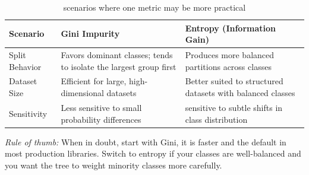 %

\begin{table}[ht]
\centering
\setlength{\tabcolsep}{10pt}
\renewcommand{\arraystretch}{1.7}
\caption{%
  scenarios where one metric may be more practical
}
\label{tab:gini-vs-entropy}
\begin{tabular}{
  >{\raggedright\arraybackslash}p{3.0cm}
  >{\raggedright\arraybackslash}p{5.0cm}
  >{\raggedright\arraybackslash}p{5.0cm}
}
\toprule
\textbf{Scenario}
  & \textbf{Gini Impurity}
  & \textbf{Entropy (Information Gain)} \\
\midrule
Split Behavior
  & Favors dominant classes; tends to isolate the largest group first
  & Produces more balanced partitions across classes \\

Dataset Size
  & Efficient for large, high-dimensional datasets
  & Better suited to structured datasets with balanced classes \\

Sensitivity
  & Less sensitive to small probability differences
  & sensitive to subtle shifts in class distribution \\

\bottomrule
\end{tabular}

\smallskip
\footnotesize
\textit{Rule of thumb:} When in doubt, start with Gini, it is faster and the default
in most production libraries. Switch to entropy if your classes are well-balanced and
you want the tree to weight minority classes more carefully.

\end{table}